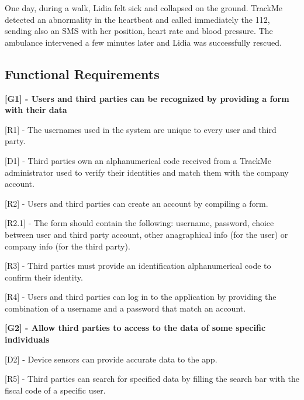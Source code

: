 One day, during a walk, Lidia felt sick and collapsed on the ground. TrackMe detected an abnormality in the heartbeat and called immediately the 112, sending also an SMS with her position, heart rate and blood pressure. The ambulance intervened a few minutes later and Lidia was successfully rescued.

\subsection{Functional Requirements}
\textbf{[G1] - Users and third parties can be recognized by providing a form with their data} \newline

[R1] -  The usernames used in the system are unique to every user and third party. \newline

[D1] - Third parties own an alphanumerical code received from a TrackMe administrator used to verify their identities and match them with the company account. \newline

[R2] - Users and third parties can create an account by compiling a form. \newline

\hspace{\parindent}[R2.1] - The form should contain the following: username, password, choice between user and third party account, other anagraphical info (for the user) or company info (for the third party). \newline

[R3] - Third parties must provide an identification alphanumerical code to confirm their identity. \newline

[R4] - Users and third parties can log in to the application by providing the combination of a username and a password that match an account. \newline

\hspace{-\parindent}\textbf{[G2] - Allow third parties to access to the data of some specific individuals} \newline

[D2] - Device sensors can provide accurate data to the app. \newline

[R5] - Third parties can search for specified data by filling the search bar with the fiscal code of a specific user. \newline

